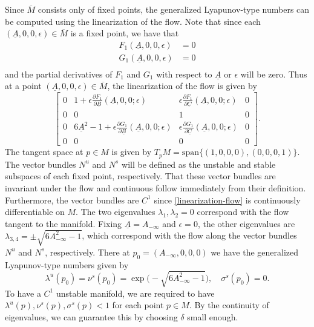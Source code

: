 Since \(\overline M\) consists only of fixed points, the generalized Lyapunov-type numbers can be computed using the linearization of the flow. Note that since each \((\underline A, 0, 0,\epsilon) \in \overline M\) is a fixed point, we have that
\begin{equation*}
	\begin{aligned}
		F_1(\underline A, 0, 0, \epsilon) &= 0 \\
		G_1(\underline A, 0, 0, \epsilon) &= 0 \\
	\end{aligned}
\end{equation*}
and the partial derivatives of \(F_1\) and \(G_1\) with respect to \(\underline A\) or \(\epsilon\) will be zero. Thus at a point \((\underline A, 0, 0, \epsilon) \in\overline M\), the linearization of the flow is given by
\begin{equation}\label{linearization-flow}
	\begin{bmatrix}
		0 & 1 + \epsilon \frac{\partial F_1}{\partial \underline B}(\underline A, 0, 0; \epsilon) & \epsilon \frac{\partial F_1}{\partial \underline C}(\underline A, 0, 0;\epsilon) & 0 \\
		0 & 0 & 1 & 0 \\
		0 & 6\underline A ^2 - 1 + \epsilon \frac{\partial G_1}{\partial \underline B}(\underline A, 0, 0; \epsilon) & \epsilon \frac{\partial G_1}{\partial \underline C}(\underline A, 0, 0; \epsilon) & 0 \\
		0 & 0 & 0 & 0
	\end{bmatrix}.
\end{equation}
The tangent space at \(p\in M\) is given by \(T_p M = \mathrm{span}\{(1,0,0,0), (0,0,0,1)\}\). The vector bundles \(N^u\) and \(N^s\) will be defined as the unstable and stable subspaces of each fixed point, respectively. That these vector bundles are invariant under the flow and continuous follow immediately from their definition. Furthermore, the vector bundles are \(C^1\) since \cref{linearization-flow} is continuously differentiable on \(M\). The two eigenvalues \(\lambda_1,\lambda_2=0\) correspond with the flow tangent to the manifold. Fixing \(\underline A = A_{-\infty}\) and \(\epsilon = 0\), the other eigenvalues are \(\lambda_{3,4} = \pm \sqrt{6A_{-\infty}^2-1}\), which correspond with the flow along the vector bundles \(N^u\) and \(N^s\), respectively. There at \(p_0 =(A_{-\infty}, 0, 0, 0)\)  we have the generalized Lyapunov-type numbers given by
\begin{equation*}
	\lambda^u(p_0) = \nu^s(p_0) = \exp\big(-\sqrt{6A_{-\infty}^2-1}\big), \quad \sigma^s(p_0) = 0.
\end{equation*}
To have a \(C^1\) unstable manifold, we are required to have \(\lambda^u(p), \nu^s(p), \sigma^s(p)  < 1\)  for each point \(p\in M\). By the continuity of eigenvalues, we can guarantee this by choosing \(\delta\) small enough. 

